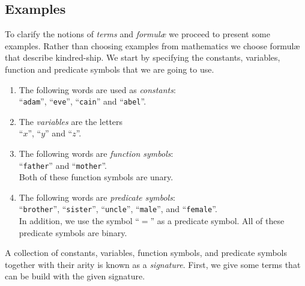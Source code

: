\subsection{Examples}
To clarify the notions of \emph{terms} and \emph{formul\ae} we proceed to present some
examples.  Rather than choosing examples from mathematics we choose {formul\ae} that
describe kindred-ship.  We start by specifying the constants, variables, function and
predicate symbols that we are going to use.
\begin{enumerate}
\item The following words are used as  \emph{constants}: \\[0.2cm]
      \hspace*{1.3cm} ``\texttt{adam}'', ``\texttt{eve}'', ``\texttt{cain}'' and ``\texttt{abel}''.
\item The \emph{variables} are the letters \\[0.2cm]
      \hspace*{1.3cm} ``$x$'', ``$y$'' and ``$z$''.
\item The following words are  \emph{function symbols}: \\[0.2cm]
      \hspace*{1.3cm} 
      ``\texttt{father}'' and ``\texttt{mother}''. 
      \\[0.2cm]
      Both of these function symbols are unary.
\item The following words are \emph{predicate symbols}: \\[0.2cm]
      \hspace*{1.3cm} 
      ``\texttt{brother}'', ``\texttt{sister}'', ``\texttt{uncle}'',
      ``\texttt{male}'', and ``\texttt{female}''. \\[0.2cm]
      In addition, we use the symbol ``$=$'' as a predicate symbol.
      All of these predicate symbols are binary.
\end{enumerate}
A collection of constants, variables, function symbols, and predicate symbols together
with their arity is known as a \emph{signature}.  First, we give some terms that can be
build with the given signature.
